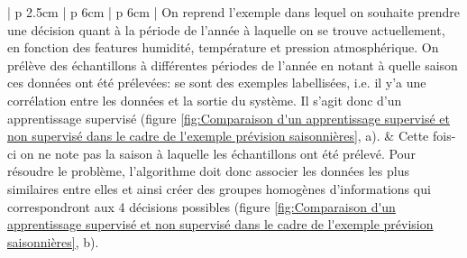 \begin{table}[h]
\begin{tabular}{ | p {2.5cm} | p {6cm} | p {6cm} |}
	On reprend l'exemple dans lequel on souhaite prendre une décision quant à la période de l'année à laquelle on se trouve actuellement, en fonction des features humidité, température et pression atmosphérique. On prélève des échantillons à différentes périodes de l'année en notant à quelle saison ces données ont été prélevées: se sont des exemples labellisées, i.e. il y'a une corrélation entre les données et la sortie du système. Il s'agit donc d'un apprentissage supervisé (figure \ref{fig:Comparaison d'un apprentissage supervisé et non supervisé dans le cadre de l'exemple prévision saisonnières}, a). &
	Cette fois-ci on ne note pas la saison à laquelle les échantillons ont été prélevé. Pour résoudre le problème, l'algorithme doit donc associer les données les plus similaires entre elles et ainsi créer des groupes homogènes d'informations qui correspondront aux 4 décisions possibles (figure \ref{fig:Comparaison d'un apprentissage supervisé et non supervisé dans le cadre de l'exemple prévision saisonnières}, b). \\
	\hline
	\end{tabular}
	\caption[Comparaison des différents modèles d'apprentissage]{Comparaison de l'apprentissage supervisé et non supervisé par des exemples}
	\label {tab: Comparaison des différentes méthodes d'apprentissage}
\end{table}

